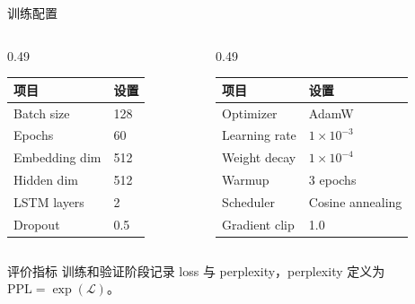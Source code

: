 \documentclass[aspectratio=169,10pt]{ctexbeamer}
\begin{document}
\begin{frame}{训练配置}
	\begin{columns}[T,onlytextwidth]
		\begin{column}{0.49\textwidth}
			\begin{table}
				\centering
				\small
				\begin{tabular}{l l}
					\toprule
					项目 & 设置 \\
					\midrule
					Batch size & 128 \\
					Epochs & 60 \\
					Embedding dim & 512 \\
					Hidden dim & 512 \\
					LSTM layers & 2 \\
					Dropout & 0.5 \\
					\bottomrule
				\end{tabular}
			\end{table}
		\end{column}
		\begin{column}{0.49\textwidth}
			\begin{table}
				\centering
				\small
				\begin{tabular}{l l}
					\toprule
					项目 & 设置 \\
					\midrule
					Optimizer & AdamW \\
					Learning rate & $1\times10^{-3}$ \\
					Weight decay & $1\times10^{-4}$ \\
					Warmup & 3 epochs \\
					Scheduler & Cosine annealing \\
					Gradient clip & 1.0 \\
					\bottomrule
				\end{tabular}
			\end{table}
		\end{column}
	\end{columns}

	\vspace{0.25cm}
	\begin{block}{评价指标}
		训练和验证阶段记录 loss 与 perplexity，perplexity 定义为 $\mathrm{PPL}=\exp(\mathcal{L})$。
	\end{block}
\end{frame}
\end{document}
